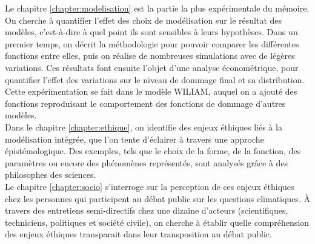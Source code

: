 Le chapitre \ref{chapter:modelisation} est la partie la plus expérimentale du mémoire. On cherche à quantifier l'effet des choix de modélisation sur le résultat des modèles, c'est-à-dire à quel point ils sont sensibles à leurs hypothèses. Dans un premier temps, on décrit la méthodologie pour pouvoir comparer les différentes fonctions entre elles, puis on réalise de nombreuses simulations avec de légères variations. Ces résultats font ensuite l'objet d'une analyse économétrique, pour quantifier l'effet des variations sur le niveau de dommage final et sa distribution. Cette expérimentation se fait dans le modèle \Gls{WILIAM}, auquel on a ajouté des fonctions reproduisant le comportement des fonctions de dommage d'autres modèles. \\

Dans le chapitre \ref{chapter:ethique}, on identifie des enjeux éthiques liés à la modélisation intégrée, que l'on tente d'éclairer à travers une approche épistémologique. Des exemples, tels que le choix de la forme, de la fonction, des paramètres ou encore des phénomènes représentés, sont analysés grâce à des philosophes des sciences. \\


Le chapitre \ref{chapter:socio} s'interroge sur la perception de ces enjeux éthiques chez les personnes qui participent au débat public sur les questions climatiques. À travers des entretiens semi-directifs chez une dizaine d'acteurs (scientifiques, techniciens, politiques et société civile), on cherche à établir quelle compréhension des enjeux éthiques transparait dans leur transposition au débat public. 

